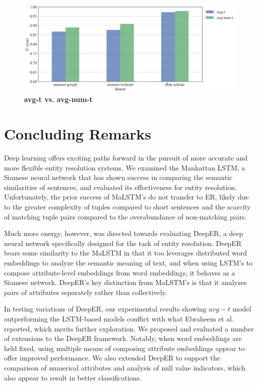 \documentclass{proc}
\begin{document}
\begin{figure}
	\includegraphics[scale=0.22]{../imgs/results-final.png}
	\caption{\textbf{avg-t vs. avg-num-t}}
	\label{fig:results-final}
\end{figure}

\section{Concluding Remarks}

Deep learning offers exciting paths forward in the pursuit of more accurate and more flexible entity resolution systems. We examined the Manhattan LSTM, a Siamese neural network that has shown success in comparing the semantic similarities of sentences, and evaluated its effectiveness for entity resolution. Unfortunately, the prior success of MaLSTM's do not transfer to ER, likely due to the greater complexity of tuples compared to short sentences and the scarcity of matching tuple pairs compared to the overabundance of non-matching pairs.

Much more energy, however, was directed towards evaluating DeepER, a deep neural network specifically designed for the task of entity resolution. DeepER bears some similarity to the MaLSTM in that it too leverages distributed word embeddings to analyze the semantic meaning of text, and when using LSTM's to compose attribute-level embeddings from word embeddings, it behaves as a Siamese network. DeepER's key distinction from MaLSTM's is that it analyzes pairs of attributes separately rather than collectively.

In testing variations of DeepER, our experimental results showing $avg-t$ model outperforming the LSTM-based models conflict with what Ebraheem et al. reported, which merits further exploration. We proposed and evaluated a number of extensions to the DeepER framework. Notably, when word embeddings are held fixed, using multiple means of composing attribute embeddings appear to offer improved performance. We also extended DeepER to support the comparison of numerical attributes and analysis of null value indicators, which also appear to result in better classifications.
\end{document}
